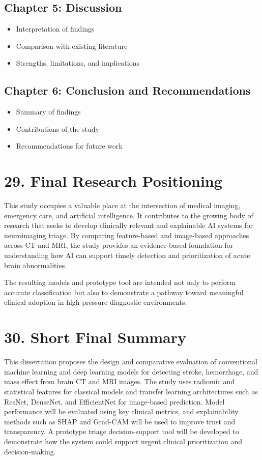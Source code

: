 \documentclass[12pt,a4paper]{report}
\begin{document}
\subsection{Chapter 5: Discussion}
\begin{itemize}
\item Interpretation of findings
\item Comparison with existing literature
\item Strengths, limitations, and implications
\end{itemize}

\subsection{Chapter 6: Conclusion and Recommendations}
\begin{itemize}
\item Summary of findings
\item Contributions of the study
\item Recommendations for future work
\end{itemize}


\section{29. Final Research Positioning}

This study occupies a valuable place at the intersection of medical imaging, emergency care, and artificial intelligence. It contributes to the growing body of research that seeks to develop clinically relevant and explainable AI systems for neuroimaging triage. By comparing feature-based and image-based approaches across CT and MRI, the study provides an evidence-based foundation for understanding how AI can support timely detection and prioritization of acute brain abnormalities.

The resulting models and prototype tool are intended not only to perform accurate classification but also to demonstrate a pathway toward meaningful clinical adoption in high-pressure diagnostic environments.


\section{30. Short Final Summary}

This dissertation proposes the design and comparative evaluation of conventional machine learning and deep learning models for detecting stroke, hemorrhage, and mass effect from brain CT and MRI images. The study uses radiomic and statistical features for classical models and transfer learning architectures such as ResNet, DenseNet, and EfficientNet for image-based prediction. Model performance will be evaluated using key clinical metrics, and explainability methods such as SHAP and Grad-CAM will be used to improve trust and transparency. A prototype triage decision-support tool will be developed to demonstrate how the system could support urgent clinical prioritization and decision-making.
\end{document}
